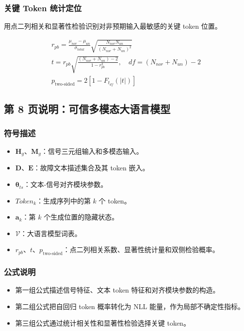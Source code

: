 ﻿\documentclass[UTF8,a4paper,10pt]{ctexart}
\begin{document}
\subsubsection*{关键 Token 统计定位}
用点二列相关和显著性检验识别对非预期输入最敏感的关键 token 位置。
\begin{formulabox}
\[\begin{gathered}
  r_{pb}
  = \frac{\mu_{nor}-\mu_{un}}{\sigma_{total}}
  \sqrt{\frac{N_{nor}N_{un}}{(N_{nor}+N_{un})^2}} \\
  t
  = r_{pb}
  \sqrt{\frac{(N_{nor}+N_{un})-2}{1-r_{pb}^{2}}}, \quad
  df=(N_{nor}+N_{un})-2 \\
  p_{\text{two-sided}}
  = 2\left[1-F_{t_{df}}(|t|)\right]
\end{gathered}\]
\end{formulabox}

\clearpage
\subsection*{第 8 页说明：可信多模态大语言模型}
\subsubsection*{符号描述}
\begin{itemize}
  \item $\bm H_g$、$\bm M_g$：信号三元组输入和多模态输入。
  \item $\bm D$、$\bm E$：故障文本描述集合及其 token 嵌入。
  \item $\bm\theta_{ts}$：文本-信号对齐模块参数。
  \item $\mathit{Token}_k$：生成序列中的第 $k$ 个 token。
  \item $\bm a_k$：第 $k$ 个生成位置的隐藏状态。
  \item $\mathcal V$：大语言模型词表。
  \item $r_{pb}$、$t$、$p_{\text{two-sided}}$：点二列相关系数、显著性统计量和双侧检验概率。
\end{itemize}
\subsubsection*{公式说明}
\begin{itemize}
  \item 第一组公式描述信号特征、文本 token 特征和对齐模块参数的构造。
  \item 第二组公式把自回归 token 概率转化为 NLL 能量，作为局部不确定性指标。
  \item 第三组公式通过统计相关性和显著性检验选择关键 token。
\end{itemize}
\end{document}
